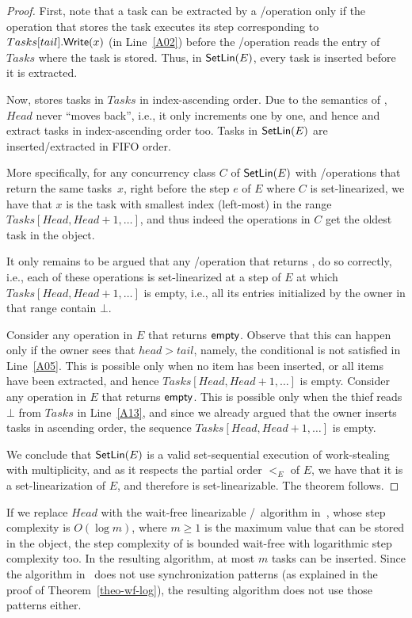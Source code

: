 \begin{proof}
First, note that a task can be extracted by a \Take/\Steal operation only if the \Put operation that stores the task executes its step corresponding to \(Tasks[tail].{\sf \small Write}(x)\) (in Line~\ref{A02}) before the \Take/\Steal operation reads the entry of \(Tasks\) where the task is stored.  Thus, in \({\sf \small SetLin}(E)\), every task is inserted before it is extracted.

Now, \Put stores tasks in \(Tasks\) in index-ascending order.  Due to the semantics of \MaxReg, \(Head\) never ``moves back'', i.e., it only increments one by one, and hence \Take and \Steal extract tasks in index-ascending order too.  Tasks in \({\sf \small SetLin}(E)\) are inserted/extracted in FIFO order.

More specifically, for any concurrency class \(C\) of \({\sf \small SetLin}(E)\) with \Take/\Steal operations that return the same tasks~\(x\), right before the step \(e\) of \(E\) where \(C\) is set-linearized, we have that \(x\) is the task with smallest index (left-most) in the range \(Tasks[Head, Head+1, \hdots]\), and thus indeed the operations in \(C\) get the oldest task in the object.

It only remains to be argued that any \Take/\Steal operation that returns \epty, do so correctly, i.e., each of these operations is set-linearized at a step of \(E\) at which \(Tasks[Head, Head+1, \hdots]\) is empty, i.e., all its entries initialized by the owner in that range contain \(\bot\).

Consider any \Take operation in \(E\) that returns \({\sf \small empty}\). Observe that this can happen only if the owner sees that \(head > tail\), namely, the conditional is not satisfied in Line~\ref{A05}.  This is possible only when no item has been inserted, or all items have been extracted, and hence \(Tasks[Head, Head+1, \hdots]\) is empty.  Consider any \Steal operation in \(E\) that returns \({\sf \small empty}\).  This is possible only when the thief reads \(\bot\) from \(Tasks\) in Line~\ref{A13}, and since we already argued that the owner inserts tasks in ascending order, the sequence \(Tasks[Head, Head+1, \hdots]\) is empty.

We conclude that \({\sf \small SetLin}(E)\) is a valid set-sequential execution of work-stealing with multiplicity, and as it respects the partial order \(<_E\) of \(E\), we have that it is a set-linearization of \(E\), and therefore \WFWSM is set-linearizable. The theorem follows.
\end{proof}

If we replace \(Head\) with the wait-free linearizable \R/\W\ \MaxReg algorithm in~\cite{DBLP_journals_jacm_AspnesAC12}, whose step complexity is \(O(\log m)\), where \(m \ge 1\) is the maximum value that can be stored in the object, the step complexity of \WFWSM is bounded wait-free with logarithmic step complexity too. In the resulting algorithm, at most $m$ tasks can be inserted.  Since the algorithm in~\cite{DBLP_journals_jacm_AspnesAC12} does not use \RAW synchronization patterns (as explained in the proof of Theorem~\ref{theo-wf-log}), the resulting algorithm does not use those patterns either.

